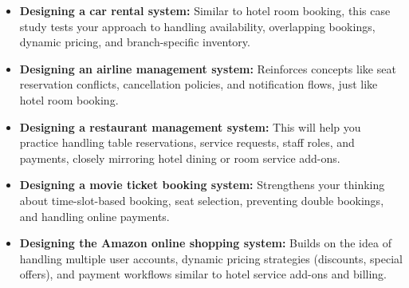 \begin{itemize}
\item
\textbf{Designing a car rental system:} Similar to hotel room booking, this case study tests your approach to handling availability, overlapping bookings, dynamic pricing, and branch-specific inventory.
\item
\textbf{Designing an airline management system:} Reinforces concepts like seat reservation conflicts, cancellation policies, and notification flows, just like hotel room booking.
\item
\textbf{Designing a restaurant management system:} This will help you practice handling table reservations, service requests, staff roles, and payments, closely mirroring hotel dining or room service add-ons.
\item
\textbf{Designing a movie ticket booking system:} Strengthens your thinking about time-slot-based booking, seat selection, preventing double bookings, and handling online payments.
\item
\protect{}\label{Ud9k7PcEfhGZCIp5SzLqx}
\textbf{Designing the Amazon online shopping system:} Builds on the idea of handling multiple user accounts, dynamic pricing strategies (discounts, special offers), and payment workflows similar to hotel service add-ons and billing.
\end{itemize}

